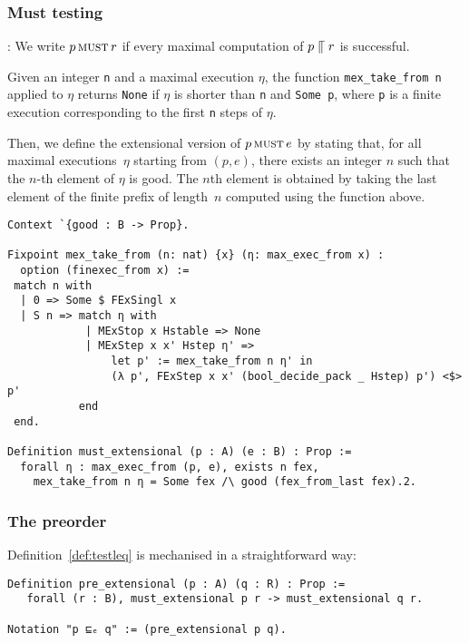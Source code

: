 \subsubsection{Must testing}

: We write $p \operatorname{\textsc{must}} r $ if every maximal
  computation of $p \mathrel{\llceil} r$ is successful.

Given an integer \texttt{n} and a maximal execution $\eta$, the function
\lstinline|mex_take_from n| applied to $\eta$ returns \texttt{None} if $\eta$
is shorter than \texttt{n} and \lstinline|Some p|, where \texttt{p} is a
finite execution corresponding to the first \texttt{n} steps of $\eta$.

Then, we define the extensional version of $p \operatorname{\textsc{must}} e$ by stating that, for
all maximal executions~$\eta$ starting from $(p, e)$, there exists an integer
$n$ such that the $n$-th element of $\eta$ is good.
%
The $n$th element is obtained by taking the last element of the finite prefix of
length~$n$ computed using the function above.

\begin{mdframed}
\begin{verbatim}
Context `{good : B -> Prop}.

Fixpoint mex_take_from (n: nat) {x} (η: max_exec_from x) :
  option (finexec_from x) :=
 match n with
  | 0 => Some $ FExSingl x
  | S n => match η with
            | MExStop x Hstable => None
            | MExStep x x' Hstep η' =>
                let p' := mex_take_from n η' in
                (λ p', FExStep x x' (bool_decide_pack _ Hstep) p') <$> p'
           end
 end.

Definition must_extensional (p : A) (e : B) : Prop :=
  forall η : max_exec_from (p, e), exists n fex,
    mex_take_from n η = Some fex /\ good (fex_from_last fex).2.
\end{verbatim}
\end{mdframed}

\subsubsection{The preorder}

Definition~\ref{def:testleq} is mechanised in a straightforward way:

\begin{mdframed}
\begin{verbatim}
Definition pre_extensional (p : A) (q : R) : Prop :=
   forall (r : B), must_extensional p r -> must_extensional q r.

Notation "p ⊑ₑ q" := (pre_extensional p q).
\end{verbatim}
\end{mdframed}


